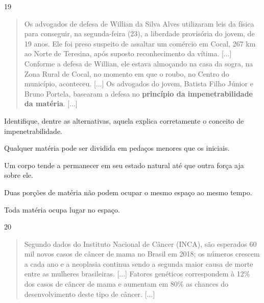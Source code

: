 \num{19}
  \begin{quote}
  Os advogados de defesa de Willian da Silva Alves utilizaram leis da
  física para conseguir, na segunda-feira
  (23), a
  liberdade provisória do jovem, de 19 anos. Ele foi
  preso suspeito
  de assaltar um
  comércio em Cocal,
  267 km ao Norte
  de Teresina,
  após suposto reconhecimento da vítima. [...]
  Conforme a defesa de Willian,
  ele estava almoçando na casa da sogra, na Zona Rural de Cocal, no
  momento em que o roubo, no Centro do município, aconteceu. [...] Os
  advogados do jovem, Batista Filho Júnior e Bruno Portela, basearam a
  defesa no \textbf{princípio da impenetrabilidade da matéria}. [...]

\end{quote}

Identifique, dentre as alternativas, aquela explica corretamente o conceito de impenetrabilidade.

\begin{escolha}
\item
  Qualquer matéria pode ser dividida em pedaços menores que os iniciais.
\item
  Um corpo tende a permanecer em seu estado natural até que outra força aja sobre ele.
\item
  Duas porções de matéria não podem ocupar o mesmo espaço ao mesmo tempo.
\item
  Toda matéria ocupa lugar no espaço.
\end{escolha}


\num{20}
\begin{quote}
Segundo dados do Instituto Nacional de Câncer (INCA), são esperados
60 mil novos casos de câncer de mama no Brasil em 2018; os números
crescem a cada ano e a neoplasia continua sendo a segunda maior causa
de morte entre as mulheres brasileiras. [...]
Fatores genéticos correspondem
à 12\% dos casos de câncer de mama e aumentam em 80\% as chances do
desenvolvimento deste tipo de câncer. [...]

\end{quote}

